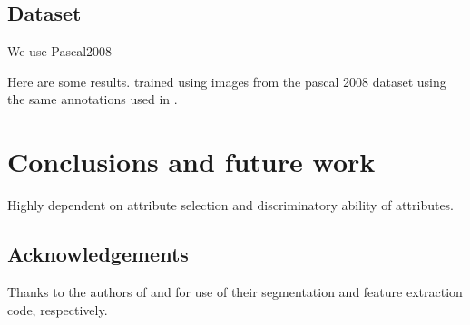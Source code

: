 \documentclass[10pt,twocolumn,letterpaper]{article}
\begin{document}
\subsection{Dataset}
\label{ssec:dataset}

We use Pascal2008 

Here are some results.
 trained using images from the pascal 
2008 dataset using the same annotations used in \cite{farhadi09}.

\section{Conclusions and future work}
\label{sec:conclusions}
Highly dependent on attribute selection and discriminatory ability of attributes.

\subsection*{Acknowledgements}
Thanks to the authors of \cite{arbelaez09} and \cite{farhadi09} for use of their
segmentation and feature extraction code, respectively.

{\small
%


}
\end{document}
